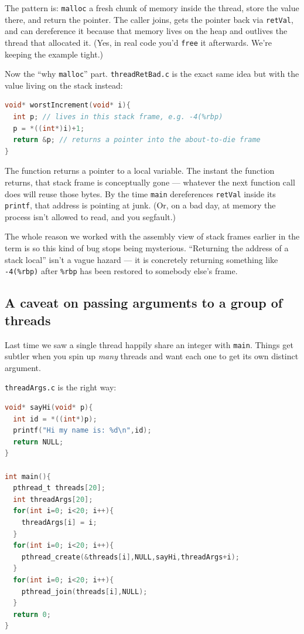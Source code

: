 \documentclass[11pt]{article}
\begin{document}
The pattern is: \texttt{malloc} a fresh chunk of memory inside the
thread, store the value there, and return the pointer. The caller
joins, gets the pointer back via \texttt{retVal}, and can dereference
it because that memory lives on the heap and outlives the thread that
allocated it. (Yes, in real code you'd \texttt{free} it afterwards.
We're keeping the example tight.)

Now the ``why \texttt{malloc}'' part. \texttt{threadRetBad.c} is the
exact same idea but with the value living on the stack instead:

\begin{lstlisting}[language=C]
void* worstIncrement(void* i){
  int p; // lives in this stack frame, e.g. -4(%rbp)
  p = *((int*)i)+1;
  return &p; // returns a pointer into the about-to-die frame
}
\end{lstlisting}

The function returns a pointer to a local variable. The instant the
function returns, that stack frame is conceptually gone --- whatever
the next function call does will reuse those bytes. By the time
\texttt{main} dereferences \texttt{retVal} inside its \texttt{printf},
that address is pointing at junk. (Or, on a bad day, at memory the
process isn't allowed to read, and you segfault.)

The whole reason we worked with the assembly view of stack frames
earlier in the term is so this kind of bug stops being mysterious.
``Returning the address of a stack local'' isn't a vague hazard --- it
is concretely returning something like \texttt{-4(\%rbp)} after
\texttt{\%rbp} has been restored to somebody else's frame.

\subsection*{A caveat on passing arguments to a group of threads}

Last time we saw a single thread happily share an integer with
\texttt{main}. Things get subtler when you spin up \emph{many} threads
and want each one to get its own distinct argument.

\texttt{threadArgs.c} is the right way:

\begin{lstlisting}[language=C]
void* sayHi(void* p){
  int id = *((int*)p);
  printf("Hi my name is: %d\n",id);
  return NULL;
}

int main(){
  pthread_t threads[20];
  int threadArgs[20];
  for(int i=0; i<20; i++){
    threadArgs[i] = i;
  }
  for(int i=0; i<20; i++){
    pthread_create(&threads[i],NULL,sayHi,threadArgs+i);
  }
  for(int i=0; i<20; i++){
    pthread_join(threads[i],NULL);
  }
  return 0;
}
\end{lstlisting}
\end{document}
